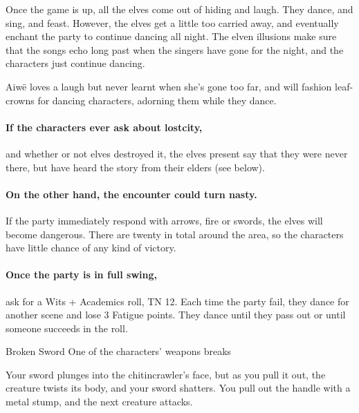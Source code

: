 \begin{multicols}{2}
Once the game is up, all the elves come out of hiding and laugh.  They dance, and sing, and feast.  However, the elves get a little too carried away, and eventually enchant the party to continue dancing all night.  The elven illusions make sure that the songs echo long past when the singers have gone for the night, and the characters just continue dancing.
 

Aiw\"{e} loves a laugh but never learnt when she's gone too far, and will fashion leaf-crowns for dancing characters, adorning them while they dance.



\paragraph{If the characters ever ask about \gls{lostcity},}
and whether or not elves destroyed it, the elves present say that they were never there, but have heard the story from their elders (see below).

\paragraph{On the other hand, the encounter could turn nasty.}
If the party immediately respond with arrows, fire or swords, the elves will become dangerous.
There are twenty in total around the area, so the characters have little chance of any kind of victory.

\paragraph{Once the party is in full swing,}
ask for a Wits + Academics roll, TN 12.
Each time the party fail, they dance for another scene and lose 3 Fatigue points.
They dance until they pass out or until someone succeeds in the roll.

{Broken Sword}%
{One of the characters' weapons breaks}%

\begin{boxtext}

	Your sword plunges into the chitincrawler's face, but as you pull it out, the creature twists its body, and your sword shatters.
	You pull out the handle with a metal stump, and the next creature attacks.


\end{boxtext}
\end{multicols}
